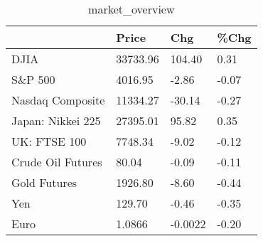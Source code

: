 \documentclass{article}%
\begin{document}
%


\begin{table}[htbp]%
\caption{market\_overview}%
\centering%
\begin{adjustbox}{width=1\textwidth}%
\begin{tabular}{llll}
\toprule
                  &    Price &     Chg &  \%Chg \\
\midrule
             DJIA & 33733.96 &  104.40 &  0.31 \\
          S\&P 500 &  4016.95 &   -2.86 & -0.07 \\
 Nasdaq Composite & 11334.27 &  -30.14 & -0.27 \\
Japan: Nikkei 225 & 27395.01 &   95.82 &  0.35 \\
     UK: FTSE 100 &  7748.34 &   -9.02 & -0.12 \\
Crude Oil Futures &    80.04 &   -0.09 & -0.11 \\
     Gold Futures &  1926.80 &   -8.60 & -0.44 \\
              Yen &   129.70 &   -0.46 & -0.35 \\
             Euro &   1.0866 & -0.0022 & -0.20 \\
\bottomrule
\end{tabular}
%
\end{adjustbox}%
\end{table}

%
\end{document}

